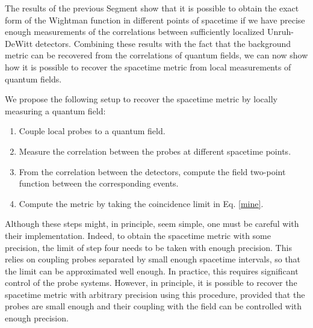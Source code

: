 \documentclass[letterpaper,12pt,titlepage,oneside,final]{book}
\begin{document}
    The results of the previous Segment show that it is possible to obtain the exact form of the Wightman function in different points of {spacetime} if we have precise enough measurements of the correlations between sufficiently localized Unruh-DeWitt detectors. Combining these results with the fact that the background metric can be recovered from the correlations of quantum fields, we can now show how it is possible to recover the spacetime metric from local measurements of quantum fields.
    
    
    We propose the following setup to recover the spacetime metric by locally measuring a quantum field:
        \begin{enumerate}
            \item Couple local probes to a quantum field.
            \item Measure the correlation between the probes at different {spacetime points}.
            \item From the correlation between the detectors, compute the field two-point function between the corresponding events.
            \item Compute the metric by taking the coincidence limit in Eq. \eqref{mine}.
        \end{enumerate} 
    Although these steps might, in principle, seem simple, one must be careful with their implementation. Indeed, to obtain the spacetime metric with some precision, the limit of step four needs to be taken with enough precision. This relies on coupling probes separated by small enough spacetime intervals, so that the limit can be approximated well enough. In practice, this requires significant control of the probe systems. However, in principle, it is possible to recover the spacetime metric with arbitrary precision using this procedure, provided that the probes are small enough and their coupling with the field can be controlled with enough precision.
    
\end{document}

